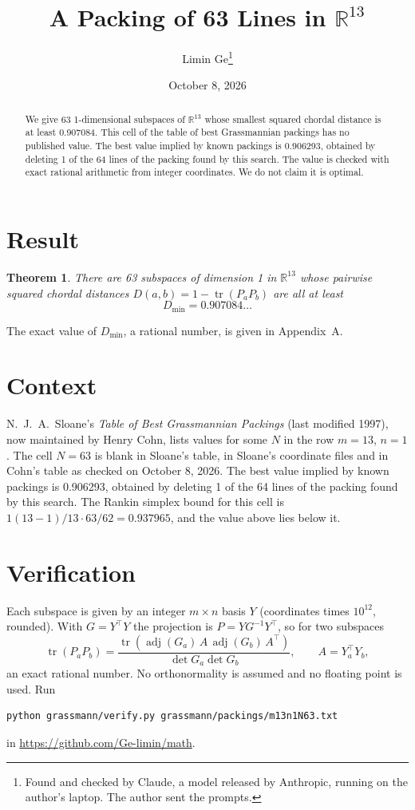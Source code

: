 \documentclass[11pt,a4paper]{article}
\title{A Packing of 63 Lines in $\mathbb{R}^{13}$}
\author{Limin Ge\thanks{Found and checked by Claude, a model released by Anthropic, running on the author's laptop. The author sent the prompts.}}
\date{October 8, 2026}
\newtheorem*{theorem}{Theorem}
\begin{document}
\maketitle
\begin{abstract}
We give 63 1-dimensional subspaces of $\mathbb{R}^{13}$ whose smallest squared chordal distance is at least 0.907084. This cell of the table of best Grassmannian packings has no published value. The best value implied by known packings is 0.906293, obtained by deleting 1 of the 64 lines of the packing found by this search. The value is checked with exact rational arithmetic from integer coordinates. We do not claim it is optimal.
\end{abstract}

\section{Result}
\begin{theorem}
There are 63 subspaces of dimension 1 in $\mathbb{R}^{13}$ whose pairwise squared chordal distances $D(a,b) = 1 - \operatorname{tr}(P_aP_b)$ are all at least
\[ D_{\min} = 0.907084\ldots \]
\end{theorem}
The exact value of $D_{\min}$, a rational number, is given in Appendix~A.


\section{Context}
N.~J.~A.~Sloane's \emph{Table of Best Grassmannian Packings} (last modified 1997), now maintained by Henry Cohn, lists values for some $N$ in the row $m=13$, $n=1$. The cell $N=63$ is blank in Sloane's table, in Sloane's coordinate files and in Cohn's table as checked on October 8, 2026. The best value implied by known packings is 0.906293, obtained by deleting 1 of the 64 lines of the packing found by this search. The Rankin simplex bound for this cell is $1(13-1)/13\cdot 63/62 = 0.937965$, and the value above lies below it.


\section{Verification}
Each subspace is given by an integer $m\times n$ basis $Y$ (coordinates times $10^{12}$, rounded). With $G=Y^\top Y$ the projection is $P=YG^{-1}Y^\top$, so for two subspaces
\[ \operatorname{tr}(P_aP_b)=\frac{\operatorname{tr}(\operatorname{adj}(G_a)\,A\,\operatorname{adj}(G_b)\,A^\top)}{\det G_a\det G_b},\qquad A=Y_a^\top Y_b, \]
an exact rational number. No orthonormality is assumed and no floating point is used. Run
\begin{verbatim}
python grassmann/verify.py grassmann/packings/m13n1N63.txt
\end{verbatim}
in \url{https://github.com/Ge-limin/math}.
\end{document}
